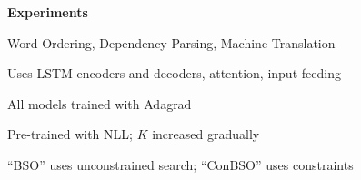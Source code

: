 \documentclass{beamer}
\let\tempone\itemize
\let\temptwo\enditemize
\renewenvironment{itemize}{\tempone\addtolength{\itemsep}{0.5\baselineskip}}{\temptwo}
\newcommand{\air}{\vspace{0.25cm}}
\begin{document}
\begin{frame}

  \begin{center}
    \textbf{Experiments}
  \end{center}

  \begin{itemize}
  \item Word Ordering, Dependency Parsing, Machine Translation
  \end{itemize}
  
\air
\air

\begin{itemize}
\item Uses LSTM encoders and decoders, attention, input feeding
\item All models trained with Adagrad~\citep{duchi2011adaptive}
\item Pre-trained with NLL; $K$ increased gradually
\item ``BSO'' uses unconstrained search; ``ConBSO'' uses constraints
\end{itemize} 
 
\end{frame}
\end{document}
